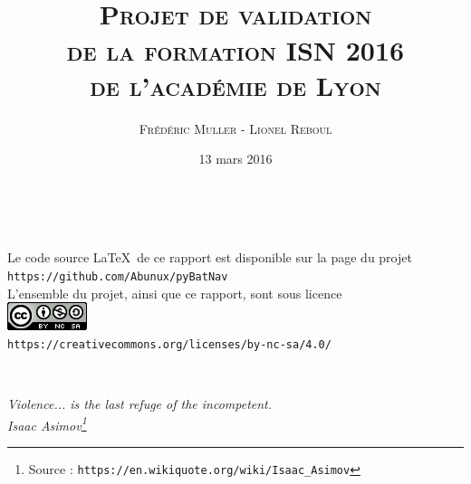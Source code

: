 \title{\\ \medskip \medskip\medskip\medskip \large{\textsc{Projet de validation\\de la formation ISN 2016\\de l'académie de Lyon}}}


\author{\textsc{Frédéric Muller} - \textsc{Lionel Reboul}
}
\date{\vfill 13 mars 2016} 

\pagestyle{empty}

\maketitle

\newpage
\ \\
\vfill

\begin{center}
Le code source \LaTeX\ de ce rapport est disponible sur la page du projet\\ \medskip
\texttt{https://github.com/Abunux/pyBatNav}\\ 
\vfill
L'ensemble du projet, ainsi que ce rapport, sont sous licence\\ \medskip
\includegraphics[scale=1]{./media/CC-Logo.png}\\
\texttt{https://creativecommons.org/licenses/by-nc-sa/4.0/}
\end{center}

\newpage
\ \\
\vspace{3cm}
\begin{flushright}


\textit{Violence... is the last refuge of the incompetent.\\
\medskip
Isaac Asimov\footnote{Source : \texttt{https://en.wikiquote.org/wiki/Isaac\_Asimov}}}

\end{flushright}
\vfill

\clearpage{\pagestyle{empty}\cleardoublepage}
\setcounter{tocdepth}{1}
\tableofcontents